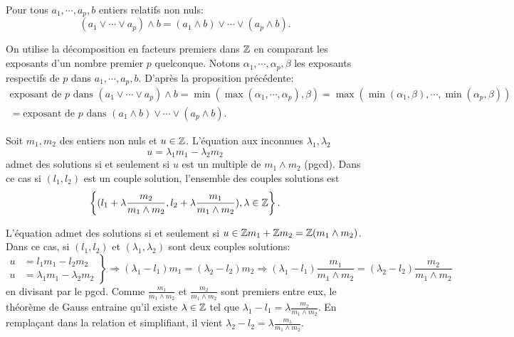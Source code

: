 \begin{propn}
  Pour tous $a_1, \cdots ,a_p, b$ entiers relatifs non nuls:
  \begin{displaymath}
    \left(a_1 \vee \cdots \vee a_p\right)\wedge b = (a_1 \wedge b) \vee \cdots \vee (a_p \wedge b).
  \end{displaymath}
\end{propn}
\begin{demo}
  On utilise la décomposition en facteurs premiers dans $\mathbb{Z}$ en comparant les exposants d'un nombre premier $p$ quelconque. Notons $\alpha_1, \cdots, \alpha_p, \beta$ les exposants respectifs de $p$ dans $a_1, \cdots, a_p, b$. D'après la proposition précédente:
  \begin{align*}
    \text{exposant de $p$ dans } \left(a_1 \vee \cdots \vee a_p\right)\wedge b
    = \min \left( \max(\alpha_1, \cdots, \alpha_p) , \beta \right)
    = \max\left( \min(\alpha_1, \beta), \cdots , \min(\alpha_p,\beta)\right) \\
    = \text{exposant de $p$ dans } (a_1 \wedge b) \vee \cdots \vee (a_p \wedge b).
  \end{align*}
\end{demo}

\begin{propn}
  Soit $m_1, m_2$ des entiers non nuls et $u\in \mathbb{Z}$. L'équation aux inconnues $\lambda_1, \lambda_2$
  \begin{displaymath}
    u = \lambda_1 m_1 - \lambda_2 m_2
  \end{displaymath}
  admet des solutions si et seulement si $u$ est un multiple de $m_1 \wedge m_2$ (pgcd). Dans ce cas si $(l_1, l_2)$ est un couple solution, l'ensemble des couples solutions est
  \begin{displaymath}
    \left \lbrace (l_1 + \lambda \frac{m_2}{m_1 \wedge m_2},l_2 + \lambda \frac{m_1}{m_1 \wedge m_2}), \lambda \in \mathbb{Z} \right\rbrace .
  \end{displaymath}
\end{propn}
\begin{demo}
  L'équation admet des solutions si et seulement si $u \in \mathbb{Z} m_1 + \mathbb{Z} m_2 = \mathbb{Z} (m_1\wedge m_2)$. Dans ce cas, si $(l_1,l_2)$ et $(\lambda_1, \lambda_2)$ sont deux couples solutions:
  \begin{displaymath}
    \left.
    \begin{aligned}
      u &= l_1 m_1 - l_2 m_2 \\
      u &= \lambda_1 m_1 - \lambda_2 m_2
    \end{aligned}
    \right\rbrace \Rightarrow (\lambda_1 - l_1)m_1 = (\lambda_2 - l_2)m_2 \Rightarrow (\lambda_1 - l_1)\frac{m_1}{m_1 \wedge m_2} = (\lambda_2 - l_2)\frac{m_2}{m_1 \wedge m_2}
  \end{displaymath}
en divisant par le pgcd. Comme $\frac{m_1}{m_1 \wedge m_2}$ et $\frac{m_2}{m_1 \wedge m_2}$ sont premiers entre eux, le théorème de Gauss entraine qu'il existe $\lambda \in \mathbb{Z}$ tel que $\lambda_1 - l_1 = \lambda \frac{m_2}{m_1 \wedge m_2}$. En remplaçant dans la relation et simplifiant, il vient $\lambda_2 - l_2 = \lambda \frac{m_1}{m_1 \wedge m_2}$.
\end{demo}

